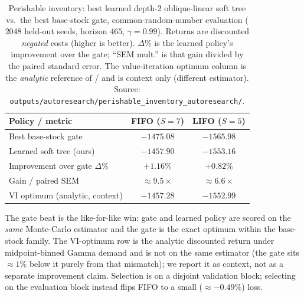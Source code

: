 \begin{table}[!htbp]
\centering
\small
\caption{Perishable inventory: best learned depth-2 oblique-linear soft tree vs.\ the best base-stock
gate, common-random-number evaluation ($2048$ held-out seeds, horizon $465$, $\gamma=0.99$). Returns
are discounted \emph{negated} costs (higher is better). $\Delta\%$ is the learned policy's improvement
over the gate; ``SEM mult.'' is that gain divided by the paired standard error. The value-iteration
optimum column is the \emph{analytic} reference of \citet{deMoor2022perishable} /
\citet{farrington2025perishable} and is context only (different estimator). Source:
\texttt{outputs/autoresearch/perishable\_inventory\_autoresearch/}.}
\label{tab:perish-results}
\begin{tabular}{lcc}
\toprule
Policy / metric & FIFO ($S=7$) & LIFO ($S=5$) \\
\midrule
Best base-stock gate & $-1475.08$ & $-1565.98$ \\
Learned soft tree (ours) & $\mathbf{-1457.90}$ & $\mathbf{-1553.16}$ \\
Improvement over gate $\Delta\%$ & $\mathbf{+1.16\%}$ & $\mathbf{+0.82\%}$ \\
Gain / paired SEM & $\approx 9.5\times$ & $\approx 6.6\times$ \\
\midrule
VI optimum (analytic, context) & $-1457.28$ & $-1552.99$ \\
\bottomrule
\end{tabular}
\par\medskip\footnotesize The gate beat is the like-for-like win: gate and learned policy are scored on
the \emph{same} Monte-Carlo estimator and the gate is the exact optimum within the base-stock family.
The VI-optimum row is the analytic discounted return under midpoint-binned Gamma demand and is not
on the same estimator (the gate sits $\approx1\%$ below it purely from that mismatch); we report it
as context, not as a separate improvement claim. Selection is on a disjoint validation block;
selecting on the evaluation block instead flips FIFO to a small ($\approx-0.49\%$) loss.
\end{table}
\FloatBarrier
